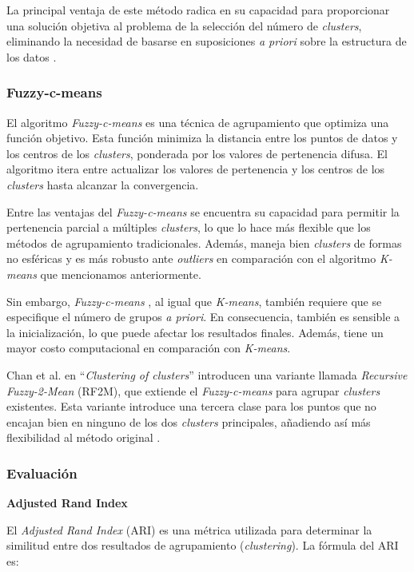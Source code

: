 \documentclass[11pt,a4paper,twoside,openany]{tesis}
\begin{document}
La principal ventaja de este método radica en su capacidad para proporcionar una solución objetiva al problema de la selección del número de \emph{clusters}, eliminando la necesidad de basarse en suposiciones \emph{a priori} sobre la estructura de los datos \cite{metodo-codo}.

\newpage
\subsubsection{Fuzzy-c-means} \textbf{ }

El algoritmo \emph{Fuzzy-c-means} es una técnica de agrupamiento que optimiza una función objetivo. Esta función minimiza la distancia entre los puntos de datos y los centros de los \emph{clusters}, ponderada por los valores de pertenencia difusa. El algoritmo itera entre actualizar los valores de pertenencia y los centros de los \emph{clusters} hasta alcanzar la convergencia. 

Entre las ventajas del \emph{Fuzzy-c-means} se encuentra su capacidad para permitir la pertenencia parcial a múltiples \emph{clusters}, lo que lo hace más flexible que los métodos de agrupamiento tradicionales. Además, maneja bien \emph{clusters} de formas no esféricas y es más robusto ante \emph{outliers} en comparación con el algoritmo \emph{K-means} que mencionamos anteriormente.

Sin embargo, \emph{Fuzzy-c-means} , al igual que \emph{K-means},  también requiere que se especifique el número de grupos \emph{a priori}. En consecuencia, también es sensible a la inicialización, lo que puede afectar los resultados finales. Además, tiene un mayor costo computacional en comparación con \emph{K-means}.

Chan et al. en ``\emph{Clustering of clusters}'' introducen una variante llamada \emph{Recursive Fuzzy-2-Mean} (RF2M), que extiende el \emph{Fuzzy-c-means} para agrupar \emph{clusters} existentes. Esta variante introduce una tercera clase para los puntos que no encajan bien en ninguno de los dos \emph{clusters} principales, añadiendo así más flexibilidad al método original \cite{fuzzy-k-means}.

\newpage
\subsubsection{Evaluación} \textbf{ }

\textbf{Adjusted Rand Index}

El \textit{Adjusted Rand Index} (ARI) es una métrica utilizada para determinar la similitud entre dos resultados de agrupamiento (\emph{clustering}). La fórmula del ARI es:
\end{document}

